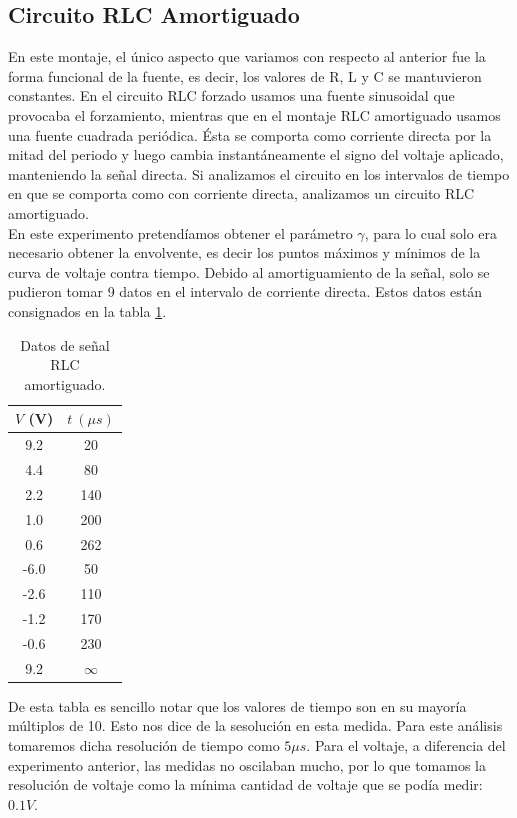 \documentclass[%
 reprint,
 amsmath,amssymb,
 aps,
]{revtex4-1}
\begin{document}
\subsection{\label{sec:level2}Circuito RLC Amortiguado}
En este montaje, el \'unico aspecto que variamos con respecto al anterior fue la forma funcional de la fuente, es decir, los valores de R, L y C se mantuvieron constantes. En el circuito RLC forzado usamos una fuente sinusoidal que provocaba el forzamiento, mientras que en el montaje RLC amortiguado usamos una fuente cuadrada peri\'odica. \'Esta se comporta como corriente directa por la mitad del periodo y luego cambia instant\'aneamente el signo del voltaje aplicado, manteniendo la señal directa. Si analizamos el circuito en los intervalos de tiempo en que se comporta como con corriente directa, analizamos un circuito RLC amortiguado.\\ 

En este experimento pretend\'iamos obtener el par\'ametro $\gamma$, para lo cual solo era necesario obtener la envolvente, es decir los puntos m\'aximos y m\'inimos de la curva de voltaje contra tiempo. Debido al amortiguamiento de la señal, solo se pudieron tomar 9 datos en el intervalo de corriente directa. Estos datos est\'an consignados en la tabla \ref{table:amortiguado}.\\

\begin{table}[h!]
\centering
 \begin{tabular}{|c|c|} 
 \hline
 $V$ (V) & $t\ (\mu s)$ \\ [0.5ex] 
 \hline\hline
9.2&	20\\
4.4&	80\\
2.2&	140\\
1.0&	200\\
0.6&	262\\
-6.0&	50\\
-2.6&	110\\
-1.2&	170\\
-0.6&	230\\
9.2 & $\infty$ \\
[1ex] 
 \hline
 \end{tabular}
 \caption{Datos de señal RLC amortiguado.}
 \label{table:amortiguado}
\end{table}

De esta tabla es sencillo notar que los valores de tiempo son en su mayor\'ia m\'ultiplos de 10. Esto nos dice de la sesoluci\'on en esta medida. Para este an\'alisis tomaremos dicha resoluci\'on de tiempo como $5\mu s$. Para el voltaje, a diferencia del experimento anterior, las medidas no oscilaban mucho, por lo que tomamos la resoluci\'on de voltaje como la m\'inima cantidad de voltaje que se pod\'ia medir: $0.1V$.\\
\end{document}
